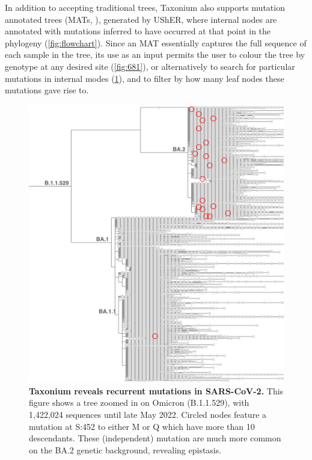 In addition to accepting traditional trees, Taxonium also supports mutation annotated trees (MATs, \citet{matutils}), generated by UShER, where internal nodes are annotated with mutations inferred to have occurred at that point in the phylogeny (\cref{fig:flowchart}). Since an MAT essentially captures the full sequence of each sample in the tree, its use as an input permits the user to colour the tree by genotype at any desired site (\cref{fig:681}), or alternatively to search for particular mutations in internal modes (\cref{fig:452}), and to filter by how many leaf nodes these mutations gave rise to.



\begin{figure}
\begin{center}
\includegraphics[width=\linewidth]{Figures/452_2.png}
\end{center}
\caption{\textbf{Taxonium reveals recurrent mutations in SARS-CoV-2.} This figure shows a tree zoomed in on Omicron (B.1.1.529), with 1,422,024 sequences until late May 2022. Circled nodes feature a mutation at S:452 to either M or Q which have more than 10 descendants. These (independent) mutation are much more common on the BA.2 genetic background, revealing epistasis.}
\label{fig:452}
\end{figure}

